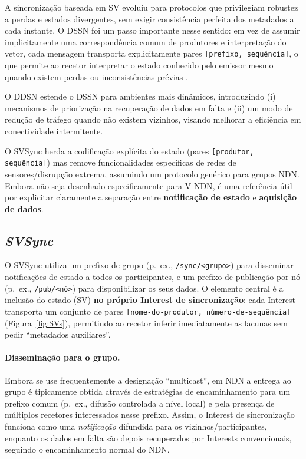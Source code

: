 A sincronização baseada em SV evoluiu para protocolos que privilegiam robustez a perdas e estados divergentes, sem exigir consistência perfeita dos metadados a cada instante. O \gls{DSSN} foi um passo importante nesse sentido: em vez de assumir implicitamente uma correspondência comum de produtores e interpretação do vetor, cada mensagem transporta explicitamente pares \texttt{[prefixo, sequência]}, o que permite ao recetor interpretar o estado conhecido pelo emissor mesmo quando existem perdas ou inconsistências prévias \cite{li_data_2018}.

O \gls{DDSN} estende o \gls{DSSN} para ambientes mais dinâmicos, introduzindo (i) mecanismos de priorização na recuperação de dados em falta e (ii) um modo de redução de tráfego quando não existem vizinhos, visando melhorar a eficiência em conectividade intermitente.

O \gls{SVSync} herda a codificação explícita do estado (pares \texttt{[produtor, sequência]}) mas remove funcionalidades específicas de redes de sensores/disrupção extrema, assumindo um protocolo genérico para grupos \gls{NDN}. Embora não seja desenhado especificamente para \gls{V-NDN}, é uma referência útil por explicitar claramente a separação entre \textbf{notificação de estado} e \textbf{aquisição de dados}.

\vspace{0.3cm}

\subsection{\emph{\gls{SVSync}}}
\label{sub:Sinc_NDN_refined}

O \gls{SVSync} utiliza um prefixo de grupo (p.\ ex., \texttt{/sync/<grupo>}) para disseminar notificações de estado a todos os participantes, e um prefixo de publicação por nó (p.\ ex., \texttt{/pub/<nó>}) para disponibilizar os seus dados. O elemento central é a inclusão do estado (SV) \textbf{no próprio Interest de sincronização}: cada Interest transporta um conjunto de pares \texttt{[nome-do-produtor, número-de-sequência]} (Figura~\ref{fig:SVs}), permitindo ao recetor inferir imediatamente as lacunas sem pedir “metadados auxiliares”.

\paragraph{Disseminação para o grupo.}
Embora se use frequentemente a designação “multicast”, em \gls{NDN} a entrega ao grupo é tipicamente obtida através de estratégias de encaminhamento para um prefixo comum (p.\ ex., difusão controlada a nível local) e pela presença de múltiplos recetores interessados nesse prefixo. Assim, o Interest de sincronização funciona como uma \textit{notificação} difundida para os vizinhos/participantes, enquanto os dados em falta são depois recuperados por Interests convencionais, seguindo o encaminhamento normal do NDN.

